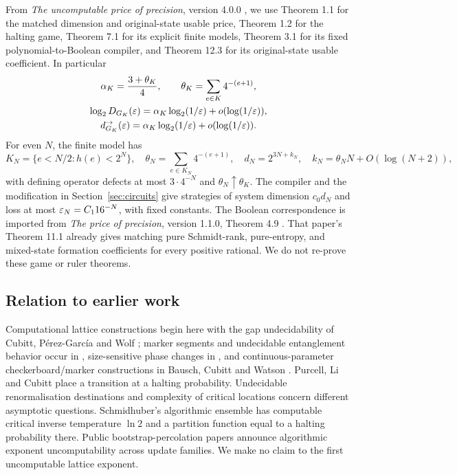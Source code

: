 From \emph{The uncomputable price of precision}, version 4.0.0
\cite{unprice}, we use Theorem 1.1 for the matched dimension and
original-state usable price, Theorem 1.2 for the halting game,
Theorem 7.1 for its explicit finite models, Theorem 3.1 for its fixed
polynomial-to-Boolean compiler, and Theorem 12.3 for its original-state
usable coefficient. In particular
\begin{equation}\label{eq:halting-import}
\begin{gathered}
 \alpha_K=\frac{3+\theta_K}{4},\qquad
 \theta_K=\sum_{e\in K}4^{-(e+1)},\\
 \log_2D_{G_K}(\varepsilon)=\alpha_K\log_2(1/\varepsilon)+o(\log(1/\varepsilon)),\\
 d_{G_K}^{\to}(\varepsilon)=\alpha_K\log_2(1/\varepsilon)+o(\log(1/\varepsilon)).
\end{gathered}
\end{equation}
For even $N$, the finite model has
\begin{equation}\label{eq:finite-import}
 K_N=\{e<N/2:h(e)<2^N\},\quad
 \theta_N=\sum_{e\in K_N}4^{-(e+1)},\quad
 d_N=2^{3N+k_N},\quad k_N=\theta_NN+O(\log(N+2)),
\end{equation}
with defining operator defects at most $3\cdot4^{-N}$ and
$\theta_N\uparrow\theta_K$.
The compiler and the modification in Section~\ref{sec:circuits} give
strategies of system dimension $c_0d_N$ and loss at most
$\varepsilon_N=C_1 16^{-N}$, with fixed constants.
The Boolean correspondence is imported from \emph{The price of
precision}, version 1.1.0, Theorem 4.9 \cite{precision}. That paper's
Theorem 11.1 already gives matching pure Schmidt-rank, pure-entropy,
and mixed-state formation coefficients for every positive rational.
We do not re-prove these game or ruler theorems.

\subsection{Relation to earlier work}\label{sec:prior}
Computational lattice constructions begin here with the gap
undecidability of Cubitt, P\'erez-Garc\'ia and Wolf \cite{cpw}; marker
segments and undecidable entanglement behavior occur in
\cite{bclp}, size-sensitive phase changes in \cite{size}, and
continuous-parameter checkerboard/marker constructions in
Bausch, Cubitt and Watson \cite{bcw}. Purcell, Li and Cubitt
\cite{chaitin} place a transition at a halting probability. Undecidable
renormalisation destinations \cite{rg} and complexity of critical
locations \cite{criticalpoints} concern different asymptotic questions.
Schmidhuber's algorithmic ensemble \cite{schmidhuber} has computable
critical inverse temperature $\ln2$ and a partition function equal to
a halting probability there. Public bootstrap-percolation papers
\cite{bootstrap,droplet} announce algorithmic exponent
uncomputability across update families. We make no claim to the first
uncomputable lattice exponent.

